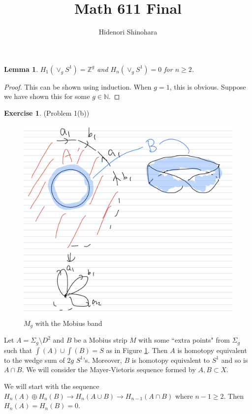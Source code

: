 \documentclass[12pt, psamsfonts]{amsart}
\newtheorem{lem}[thm]{Lemma}
\theoremstyle{definition}
\newtheorem*{exer}{Exercise}
\theoremstyle{remark}
\numberwithin{equation}{section}
\begin{document}
\title{Math 611 Final}
\author{Hidenori Shinohara}
\maketitle

\begin{lem}
  $H_1(\vee_g S^1) = \mathbb{Z}^g$ and $H_n(\vee_g S^1) = 0$ for $n \geq 2$.
\end{lem}

\begin{proof}
  This can be shown using induction.
  When $g = 1$, this is obvious.
  Suppose we have shown this for some $g \in \mathbb{N}$.
\end{proof}

\begin{exer}{(Problem 1(b))}
  \begin{figure}
    \includegraphics[width=.5\linewidth]{Mg.jpeg}
    \caption{$M_g$ with the Mobius band}
    \label{fig:mg}
  \end{figure}
  Let $A = \Sigma_g \setminus D^2$ and $B$ be a Mobius strip $M$ with some ``extra points" from $\Sigma_g$ such that $\int(A) \cup \int(B) = S$ as in Figure \ref{fig:mg}.
  Then $A$ is homotopy equivalent to the wedge sum of $2g$ $S^1$'s.
  Moreover, $B$ is homotopy equivalent to $S^1$ and so is $A \cap B$.
  We will consider the Mayer-Vietoris sequence formed by $A, B \subset X$.

  We will start with the sequence $H_n(A) \oplus H_n(B) \rightarrow H_n(A \cup B) \rightarrow H_{n - 1}(A \cap B)$ where $n - 1 \geq 2$.
  Then $H_n(A) = H_n(B) = 0$.


\end{exer}
\end{document}
